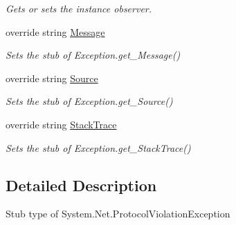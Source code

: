 \begin{DoxyCompactItemize}
\begin{DoxyCompactList}\small\item\em Gets or sets the instance observer.\end{DoxyCompactList}\item 
override string \hyperlink{class_system_1_1_net_1_1_fakes_1_1_stub_protocol_violation_exception_a6a1bd1931d87ff0313f81ee51e74a7ff}{Message}
\begin{DoxyCompactList}\small\item\em Sets the stub of Exception.\-get\-\_\-\-Message()\end{DoxyCompactList}\item 
override string \hyperlink{class_system_1_1_net_1_1_fakes_1_1_stub_protocol_violation_exception_ad0f093a450534d5f90af6f1aa61cbae1}{Source}
\begin{DoxyCompactList}\small\item\em Sets the stub of Exception.\-get\-\_\-\-Source()\end{DoxyCompactList}\item 
override string \hyperlink{class_system_1_1_net_1_1_fakes_1_1_stub_protocol_violation_exception_a551613f75f8677331560af99837708aa}{Stack\-Trace}
\begin{DoxyCompactList}\small\item\em Sets the stub of Exception.\-get\-\_\-\-Stack\-Trace()\end{DoxyCompactList}\end{DoxyCompactItemize}


\subsection{Detailed Description}
Stub type of System.\-Net.\-Protocol\-Violation\-Exception



